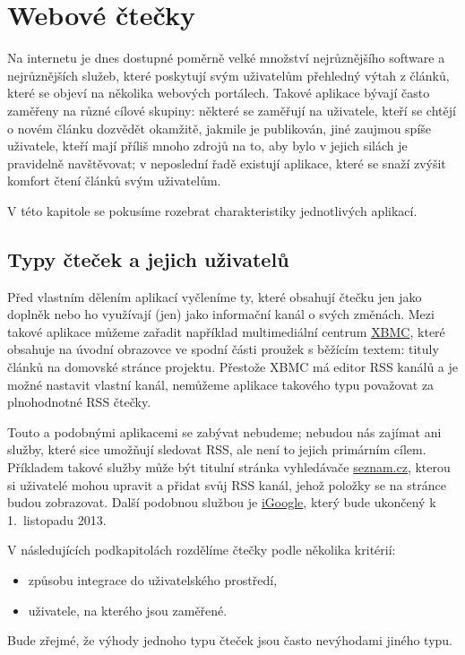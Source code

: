 \chapter{Webové čtečky}

Na internetu je dnes dostupné poměrně velké množství nejrůznějšího software a nejrůznějších služeb, které poskytují svým uživatelům přehledný výtah z článků, které se objeví na několika webových portálech.
Takové aplikace bývají často zaměřeny na různé cílové skupiny: některé se zaměřují na uživatele, kteří se chtějí o novém článku dozvědět okamžitě, jakmile je publikován, jiné zaujmou spíše uživatele, kteří mají příliš mnoho zdrojů na to, aby bylo v jejich silách je pravidelně navštěvovat; v neposlední řadě existují aplikace, které se snaží zvýšit komfort čtení článků svým uživatelům.

V této kapitole se pokusíme rozebrat charakteristiky jednotlivých aplikací.

\section{Typy čteček a jejich uživatelů}

Před vlastním dělením aplikací vyčleníme ty, které obsahují čtečku  jen jako doplněk nebo ho využívají (jen) jako informační kanál o svých změnách.
Mezi takové aplikace můžeme zařadit například multimediální centrum \href{http://xbmc.org/}{XBMC}, které obsahuje na úvodní obrazovce ve spodní části proužek s běžícím textem: tituly článků na domovské stránce projektu.
Přestože XBMC má editor RSS kanálů a je možné nastavit vlastní kanál, nemůžeme aplikace takového typu považovat za plnohodnotné RSS čtečky.

Touto a podobnými aplikacemi se zabývat nebudeme; nebudou nás zajímat ani služby, které sice umožňují sledovat RSS, ale není to jejich primárním cílem.
Příkladem takové služby může být titulní stránka vyhledávače \href{http://seznam.cz}{seznam.cz}, kterou si uživatelé mohou upravit a přidat svůj RSS kanál, jehož položky se na stránce budou zobrazovat.
Další podobnou službou je \href{http://www.google.com/ig}{iGoogle}, který bude ukončený k 1.~listopadu 2013.

\bigskip

V následujících podkapitolách rozdělíme čtečky podle několika kritérií:
\begin{itemize}
	\item způsobu integrace do uživatelského prostředí,
	\item uživatele, na kterého jsou zaměřené.
\end{itemize}
Bude zřejmé, že výhody jednoho typu čteček jsou často nevýhodami jiného typu.

